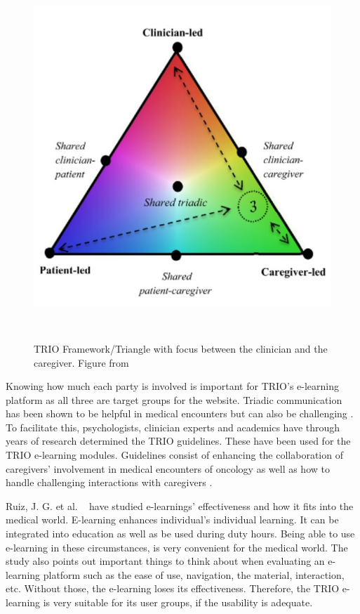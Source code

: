 \documentclass{sigchi}
\begin{document}
\begin{figure}[H]
\centering
  \includegraphics[width=0.9\columnwidth]{figures/Triangle3Screenshot.jpg}
  \caption{TRIO Framework/Triangle with focus between the clinician and the caregiver. Figure from}~\label{fig:figure1}
\end{figure}

Knowing how much each party is involved is important for TRIO’s e-learning platform as all three are target groups for the website. Triadic communication has been shown to be helpful in medical encounters but can also be challenging \cite{Laidsaar-Powell2013}. To facilitate this, psychologists, clinician experts and academics have through years of research determined the TRIO guidelines. These have been used for the TRIO e-learning modules. Guidelines consist of enhancing the collaboration of caregivers' involvement in medical encounters of oncology as well as how to handle challenging interactions with caregivers \cite{Laidsaar-Powell2018a} \cite{Laidsaar-Powell2018}.

Ruiz, J. G. et al. ~\cite{Ruiz2006} have studied e-learnings’ effectiveness and how it fits into the medical world. E-learning enhances individual’s individual learning. It can be integrated into education as well as be used during duty hours. Being able to use e-learning in these circumstances, is very convenient for the medical world. The study also points out important things to think about when evaluating an e-learning platform such as the ease of use, navigation, the material, interaction, etc. Without those, the e-learning loses its effectiveness. Therefore, the TRIO e-learning is very suitable for its user groups, if the usability is adequate. 
\end{document}
